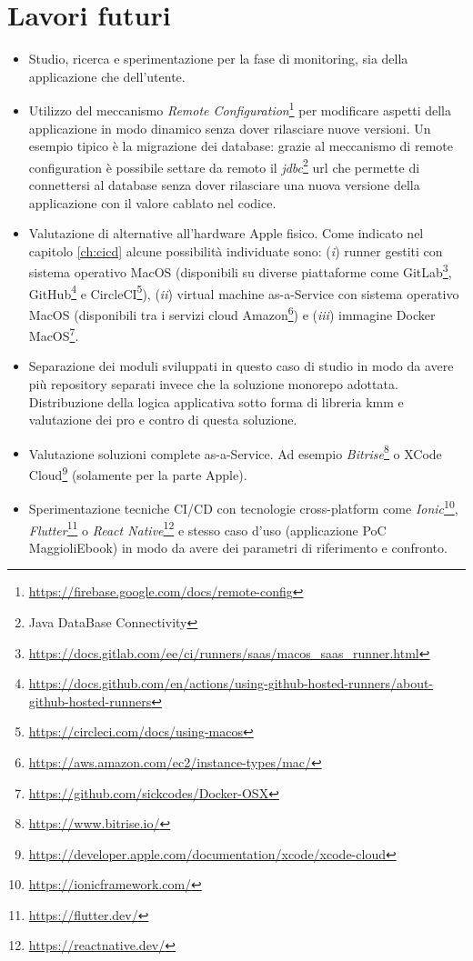 \section{Lavori futuri}
\begin{itemize}
        \item Studio, ricerca e sperimentazione per la fase di monitoring, sia della applicazione che dell'utente.
        \item Utilizzo del meccanismo \textit{Remote Configuration}\footnote{\url{https://firebase.google.com/docs/remote-config}} per modificare aspetti della applicazione in modo dinamico senza dover rilasciare nuove versioni. Un esempio tipico è la migrazione dei database: grazie al meccanismo di remote configuration è possibile settare da remoto il \textit{jdbc}\footnote{Java DataBase Connectivity} url che permette di connettersi al database senza dover rilasciare una nuova versione della applicazione con il valore cablato nel codice.
        \item Valutazione di alternative all'hardware Apple fisico. Come indicato nel capitolo \ref{ch:cicd} alcune possibilità individuate sono: (\textit{i}) runner gestiti con sistema operativo MacOS (disponibili su diverse piattaforme come GitLab\footnote{\url{https://docs.gitlab.com/ee/ci/runners/saas/macos_saas_runner.html}}, GitHub\footnote{\url{https://docs.github.com/en/actions/using-github-hosted-runners/about-github-hosted-runners}} e CircleCI\footnote{\url{https://circleci.com/docs/using-macos}}), (\textit{ii}) virtual machine as-a-Service con sistema operativo MacOS (disponibili tra i servizi cloud Amazon\footnote{\url{https://aws.amazon.com/ec2/instance-types/mac/}}) e (\textit{iii}) immagine Docker MacOS\footnote{\url{https://github.com/sickcodes/Docker-OSX}}.
        \item Separazione dei moduli sviluppati in questo caso di studio in modo da avere più repository separati invece che la soluzione monorepo adottata. Distribuzione della logica applicativa sotto forma di libreria kmm e valutazione dei pro e contro di questa soluzione.
        \item Valutazione soluzioni complete as-a-Service. Ad esempio \textit{Bitrise}\footnote{\url{https://www.bitrise.io/}} o XCode Cloud\footnote{\url{https://developer.apple.com/documentation/xcode/xcode-cloud}} (solamente per la parte Apple).
        \item Sperimentazione tecniche CI/CD con tecnologie cross-platform come \textit{Ionic}\footnote{\url{https://ionicframework.com/}}, \textit{Flutter}\footnote{\url{https://flutter.dev/}} o \textit{React Native}\footnote{\url{https://reactnative.dev/}} e stesso caso d'uso (applicazione PoC MaggioliEbook) in modo da avere dei parametri di riferimento e confronto.
\end{itemize}